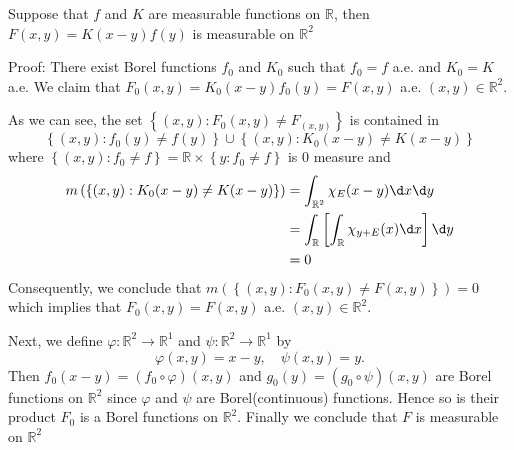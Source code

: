 \documentclass[12pt, a4paper, oneside]{book}
\begin{document}
\begin{lemma}
    Suppose that $f$ and $K$ are measurable functions on $\mathbb{R}$, then $F(x,y)=K(x-y)f(y)$ is measurable on $\mathbb{R}^2$

    Proof:
    There exist Borel functions $f_0$ and $K_0$ such that $f_0=f$ a.e. and $K_0=K$ a.e. We claim that $F_0(x,y)=K_0(x-y)f_0(y)=F(x,y)$ a.e. $(x,y)\in \mathbb{R}^2$.

    As we can see, the set $\left\{(x,y) : F_0(x,y)\neq F_(x,y)\right\}$ is contained in
    \begin{equation*}\left\{(x,y) :f_0(y)\neq f(y)\right\} \cup
        \left\{(x,y) :K_0(x-y)\neq K(x-y)\right\} \end{equation*}
    where $\left\{(x,y) :f_0\neq f\right\}=\mathbb{R} \times \left\{y :f_0\neq f\right\}$
    is $0$ measure and
    \begin{equation*}
        \begin{aligned}
            m\left(\left\{(x,y) :K_0(x-y)\neq K(x-y)\right\}\right) &
            =\int_{\mathbb{R}^2} \chi_E (x-y) \d x\d y                                                                                     \\
                                                                    & =\int_\mathbb{R} \left[\int_\mathbb{R} \chi_{y+E}(x)\d x\right] \d y \\
                                                                    & =0
        \end{aligned}
    \end{equation*}
    Consequently, we conclude that $m\left(\left\{(x,y) : F_0(x,y)\neq F(x,y)\right\}\right)=0$ which implies that $F_0(x,y)=F(x,y)$ a.e. $(x,y)\in \mathbb{R}^2$.

    Next, we define $\varphi: \mathbb{R}^2 \rightarrow \mathbb{R}^1$ and $\psi: \mathbb{R}^2 \rightarrow \mathbb{R}^1$ by
    \begin{equation*}
        \varphi(x, y)=x-y, \quad \psi(x, y)=y .
    \end{equation*}
    Then $f_0(x-y)=(f_0 \circ \varphi)(x, y)$ and $g_0(y)=(g_0 \circ \psi)(x, y)$ are Borel functions on $\mathbb{R}^2$ since $\varphi$ and $\psi$ are Borel(continuous) functions. Hence so is their product $F_0$ is a Borel functions on $\mathbb{R}^2$. Finally we conclude that $F$ is measurable on $\mathbb{R}^2$
\end{lemma}
\end{document}
